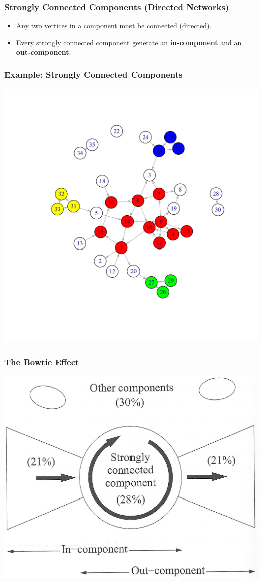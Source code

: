 \documentclass[smaller]{beamer}
\begin{document}
\begin{frame} 
   \frametitle{Strongly Connected Components (Directed Networks)}    
   \begin{itemize}
   \item Any two vertices in a component must be connected (directed).
   \item Every strongly connected component generate an {\bf in-component} and an {\bf out-component}.
   \end{itemize} 
\end{frame}

\begin{frame} 
   \frametitle{Example: Strongly Connected Components} 
   \includegraphics[scale=0.55]{figures/strong_dg.pdf} 
\end{frame}

\begin{frame} 
   \frametitle{The Bowtie Effect} 
   \includegraphics[scale=1.4]{figures/bow_tie.jpg} 
\end{frame}
\end{document}
